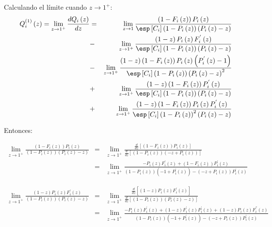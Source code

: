 Calculando el l\'imite cuando $z\rightarrow1^{+}$:
\begin{eqnarray}
Q_{i}^{(1)}\left(z\right)=\lim_{z\rightarrow1^{+}}\frac{d Q_{i}\left(z\right)}{dz}&=&\lim_{z\rightarrow1}\frac{\left(1-F_{i}\left(z\right)\right)P_{i}\left(z\right)}{\esp\left[C_{i}\right]\left(1-P_{i}\left(z\right)\right)\left(P_{i}\left(z\right)-z\right)}\\
&-&\lim_{z\rightarrow1^{+}}\frac{\left(1-z\right)P_{i}\left(z\right)F_{i}^{'}\left(z\right)}{\esp\left[C_{i}\right]\left(1-P_{i}\left(z\right)\right)\left(P_{i}\left(z\right)-z\right)}\\
&-&\lim_{z\rightarrow1^{+}}\frac{\left(1-z\right)\left(1-F_{i}\left(z\right)\right)P_{i}\left(z\right)\left(P_{i}^{'}\left(z\right)-1\right)}{\esp\left[C_{i}\right]\left(1-P_{i}\left(z\right)\right)\left(P_{i}\left(z\right)-z\right)^{2}}\\
&+&\lim_{z\rightarrow1^{+}}\frac{\left(1-z\right)\left(1-F_{i}\left(z\right)\right)P_{i}^{'}\left(z\right)}{\esp\left[C_{i}\right]\left(1-P_{i}\left(z\right)\right)\left(P_{i}\left(z\right)-z\right)}\\
&+&\lim_{z\rightarrow1^{+}}\frac{\left(1-z\right)\left(1-F_{i}\left(z\right)\right)P_{i}\left(z\right)P_{i}^{'}\left(z\right)}{\esp\left[C_{i}\right]\left(1-P_{i}\left(z\right)\right)^{2}\left(P_{i}\left(z\right)-z\right)}
\end{eqnarray}

Entonces:

\begin{eqnarray*}
\lim_{z\rightarrow1^{+}}\frac{\left(1-F_{i}\left(z\right)\right)P_{i}\left(z\right)}{\left(1-P_{i}\left(z\right)\right)\left(P_{i}\left(z\right)-z\right)}&=&\lim_{z\rightarrow1^{+}}\frac{\frac{d}{dz}\left[\left(1-F_{i}\left(z\right)\right)P_{i}\left(z\right)\right]}{\frac{d}{dz}\left[\left(1-P_{i}\left(z\right)\right)\left(-z+P_{i}\left(z\right)\right)\right]}\\
&=&\lim_{z\rightarrow1^{+}}\frac{-P_{i}\left(z\right)F_{i}^{'}\left(z\right)+\left(1-F_{i}\left(z\right)\right)P_{i}^{'}\left(z\right)}{\left(1-P_{i}\left(z\right)\right)\left(-1+P_{i}^{'}\left(z\right)\right)-\left(-z+P_{i}\left(z\right)\right)P_{i}^{'}\left(z\right)}
\end{eqnarray*}




\begin{eqnarray*}
\lim_{z\rightarrow1^{+}}\frac{\left(1-z\right)P_{i}\left(z\right)F_{i}^{'}\left(z\right)}{\left(1-P_{i}\left(z\right)\right)\left(P_{i}\left(z\right)-z\right)}&=&\lim_{z\rightarrow1^{+}}\frac{\frac{d}{dz}\left[\left(1-z\right)P_{i}\left(z\right)F_{i}^{'}\left(z\right)\right]}{\frac{d}{dz}\left[\left(1-P_{i}\left(z\right)\right)\left(P_{i}\left(z\right)-z\right)\right]}\\
&=&\lim_{z\rightarrow1^{+}}\frac{-P_{i}\left(z\right) F_{i}^{'}\left(z\right)+(1-z) F_{i}^{'}\left(z\right) P_{i}^{'}\left(z\right)+(1-z) P_{i}\left(z\right)F_{i}^{''}\left(z\right)}{\left(1-P_{i}\left(z\right)\right)\left(-1+P_{i}^{'}\left(z\right)\right)-\left(-z+P_{i}\left(z\right)\right)P_{i}^{'}\left(z\right)}
\end{eqnarray*}


